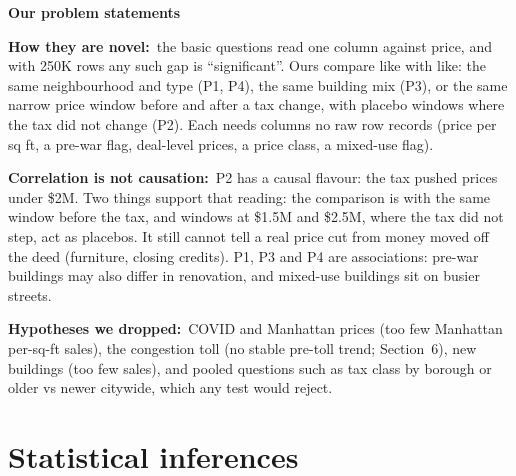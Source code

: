 \documentclass[10pt,a4paper,twocolumn]{article}
\newcommand{\minihead}[1]{\par\needspace{8\baselineskip}\smallskip\textbf{#1}\par}
\newcommand{\lab}[2]{\textbf{#1}~#2\par}
\begin{document}
\minihead{Our problem statements}
\noindent{}

\lab{How they are novel:}{the basic questions read one column against price, and with 250K rows
any such gap is ``significant''. Ours compare like with like: the same neighbourhood and type (P1,
P4), the same building mix (P3), or the same narrow price window before and after a tax change,
with placebo windows where the tax did not change (P2). Each needs columns no raw row records
(price per sq ft, a pre-war flag, deal-level prices, a price class, a mixed-use flag).}

\lab{Correlation is not causation:}{P2 has a causal flavour: the tax pushed prices under \$2M. Two
things support that reading: the comparison is with the same window before the tax, and windows
at \$1.5M and \$2.5M, where the tax did not step, act as placebos. It still cannot tell a real price
cut from money moved off the deed (furniture, closing credits). P1, P3 and P4 are associations:
pre-war buildings may also differ in renovation, and mixed-use buildings sit on busier streets.}

\lab{Hypotheses we dropped:}{COVID and Manhattan prices (too few Manhattan per-sq-ft sales), the
congestion toll (no stable pre-toll trend; Section~6), new buildings (too few sales), and pooled
questions such as tax class by borough or older vs newer citywide, which any test would reject.}

\section{Statistical inferences}\label{sec:tests}
\end{document}
